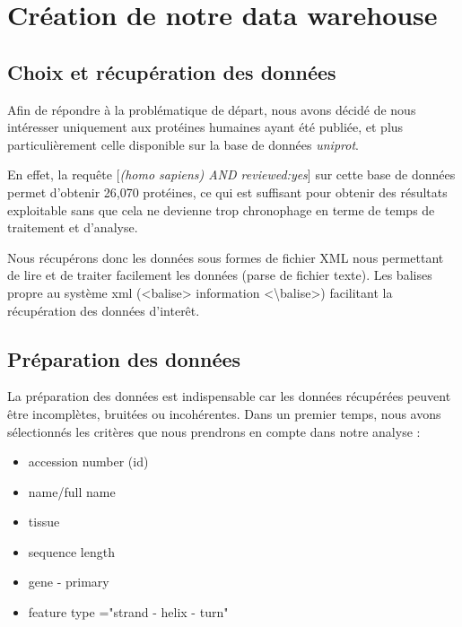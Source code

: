 \section*{Création de notre data warehouse}

\subsection*{Choix et récupération des données}


Afin de répondre à la problématique de départ, nous avons décidé de nous intéresser uniquement aux protéines humaines ayant été publiée, et plus particulièrement celle disponible sur la base de données \emph{uniprot}.

En effet, la requête [\emph{(homo sapiens) AND reviewed:yes}] sur cette base de données permet d'obtenir 26,070 protéines, ce qui est suffisant pour obtenir des résultats exploitable sans que cela ne devienne trop chronophage en terme de temps de traitement et d'analyse.

Nous récupérons donc les données sous formes de fichier XML nous permettant de lire et de traiter facilement les données (parse de fichier texte). Les balises propre au système xml (<balise> information <\textbackslash balise>) facilitant la récupération des données d'inter\^et.

\subsection*{Préparation des données}

La préparation des données est indispensable car les données récupérées peuvent être incomplètes, bruitées ou incohérentes. 
Dans un premier temps, nous avons sélectionnés les critères que nous prendrons en compte dans notre analyse :
\renewcommand\labelitemi{\textbullet}
\begin{itemize}
\item accession number (id)
\item name/full name
\item tissue
\item sequence length
\item gene - primary
\item feature type ="strand  - helix - turn"
\end{itemize}

